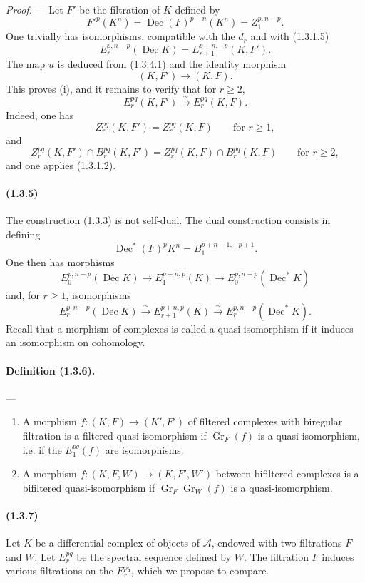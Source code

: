 \documentclass[10pt]{article}
\newcommand{\Gr}{\operatorname{Gr}}
\newcommand{\calA}{\mathcal A}
\newcommand{\iso}{\xrightarrow{\sim}}
\newcommand{\Dec}{\operatorname{Dec}}
\begin{document}
\emph{Proof.} --- Let $F'$ be the filtration of $K$ defined by
\[
F'^p(K^n)=\Dec(F)^{p-n}(K^n)=Z_1^{p,n-p}.
\]
One trivially has isomorphisms, compatible with the $d_r$ and with (1.3.1.5)
\[
\tag{1.3.4.1}
E_r^{p,n-p}(\Dec K)=E_{r+1}^{p+n,-p}(K,F').
\]
The map $u$ is deduced from (1.3.4.1) and the identity morphism
\[
(K,F')\longrightarrow(K,F).
\]
This proves (i), and it remains to verify that for $r\ge2$,
\[
E_r^{pq}(K,F')\iso E_r^{pq}(K,F).
\]
Indeed, one has
\[
Z_r^{pq}(K,F')=Z_r^{pq}(K,F)\qquad\text{for }r\ge1,
\]
and
\[
Z_r^{pq}(K,F')\cap B_r^{pq}(K,F')=Z_r^{pq}(K,F)\cap B_r^{pq}(K,F)\qquad\text{for }r\ge2,
\]
and one applies (1.3.1.2).

\paragraph{(1.3.5)} The construction (1.3.3) is not self-dual. The dual construction consists in defining
\[
\Dec^*(F)^pK^n=B_1^{p+n-1,-p+1}.
\]
One then has morphisms
\[
E_0^{p,n-p}(\Dec K)\longrightarrow E_1^{p+n,p}(K)\longrightarrow E_0^{p,n-p}(\Dec^*K)
\]
and, for $r\ge1$, isomorphisms
\[
E_r^{p,n-p}(\Dec K)\iso E_{r+1}^{p+n,p}(K)\iso E_r^{p,n-p}(\Dec^*K).
\]
Recall that a morphism of complexes is called a quasi-isomorphism if it induces an isomorphism on cohomology.

\paragraph{Definition (1.3.6).} ---
\begin{enumerate}[label=(\roman*)]
\item A morphism $f:(K,F)\to(K',F')$ of filtered complexes with biregular filtration is a filtered quasi-isomorphism if $\Gr_F(f)$ is a quasi-isomorphism, i.e. if the $E_1^{pq}(f)$ are isomorphisms.
\item A morphism $f:(K,F,W)\to(K,F',W')$ between bifiltered complexes is a bifiltered quasi-isomorphism if $\Gr_F\Gr_W(f)$ is a quasi-isomorphism.
\end{enumerate}

\paragraph{(1.3.7)} Let $K$ be a differential complex of objects of $\calA$, endowed with two filtrations $F$ and $W$. Let $E_r^{pq}$ be the spectral sequence defined by $W$. The filtration $F$ induces various filtrations on the $E_r^{pq}$, which we propose to compare.
\end{document}
